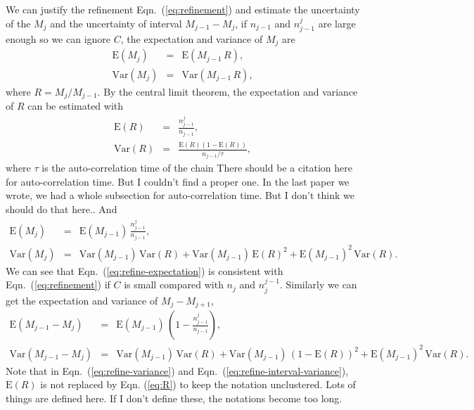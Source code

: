 \documentclass[letterpaper, preprint]{aastex}
\newcommand{\qer}[1]{{\color{red}#1}}
\begin{document}
We can justify the refinement Eqn.~(\ref{eq:refinement}) and estimate the uncertainty of the $M_j$ and the uncertainty of interval $M_{j-1}-M_{j}$, if $n_{j-1}$ and $n_{j-1}^j$ are large enough so we can ignore $C$, the expectation and variance of $M_j$ are
\begin{eqnarray*}
\mathrm{E}(M_j) &=& \mathrm{E}(M_{j-1}\,R),\label{eq:R}\\
\mathrm{Var}(M_j)& =&\mathrm{Var}(M_{j-1}\,R),
\end{eqnarray*}
where $R = M_j/M_{j-1}$. By the central limit theorem, the expectation and variance of $R$ can be estimated with
\begin{eqnarray}
\mathrm{E}(R) & = & \frac{n_{j-1}^j}{n_{j-1}},\\
\mathrm{Var}(R) & = & \frac{\mathrm{E}(R)\left(1-\mathrm{E}(R)\right)}{n_{j-1}/\tau},
\end{eqnarray}
where $\tau$ is the auto-correlation time of the chain \qer{There should be a citation here for auto-correlation time. But I couldn't find a proper one. In the last paper we wrote, we had a whole subsection for auto-correlation time. But I don't think we should do that here.}. And
\begin{eqnarray}
\mathrm{E}(M_j) &=& \mathrm{E}(M_{j-1}) \, \frac{n_{j-1}^j}{n_{j-1}}, \label{eq:refine-expectation}\\
\mathrm{Var}(M_j) &=& \mathrm{Var}(M_{j-1}) \, \mathrm{Var}(R)+ \mathrm{Var}(M_{j-1}) \, \mathrm{E}(R)^2+\mathrm{E}(M_{j-1})^2 \, \mathrm{Var}(R).\label{eq:refine-variance}
\end{eqnarray}
We can see that Eqn.~(\ref{eq:refine-expectation}) is consistent with Eqn.~(\ref{eq:refinement}) if $C$ is small compared with $n_j$ and $n_j^{j-1}$. Similarly we can get the expectation and variance of $M_j-M_{j+1}$,
\begin{eqnarray}
\mathrm{E}(M_{j-1}-M_{j}) &=& \mathrm{E}(M_{j-1})\,\left(1-\frac{n_{j-1}^j}{n_{j-1}}\right), \label{eq:refine-interval-expectation}\\
\mathrm{Var}(M_{j-1}-M_{j}) &=& \mathrm{Var}(M_{j-1})\,\mathrm{Var}(R)+ \mathrm{Var}(M_{j-1})\,\left(1-\mathrm{E}(R)\right)^2+\mathrm{E}(M_{j-1})^2\,\mathrm{Var}(R).\label{eq:refine-interval-variance}
\end{eqnarray}
Note that in Eqn.~(\ref{eq:refine-variance}) and Eqn.~(\ref{eq:refine-interval-variance}), $\mathrm{E}(R)$ is not replaced by Eqn. (\ref{eq:R}) to keep the notation unclustered. \qer{Lots of things are defined here. If I don't define these, the notations become too long.}
\end{document}
